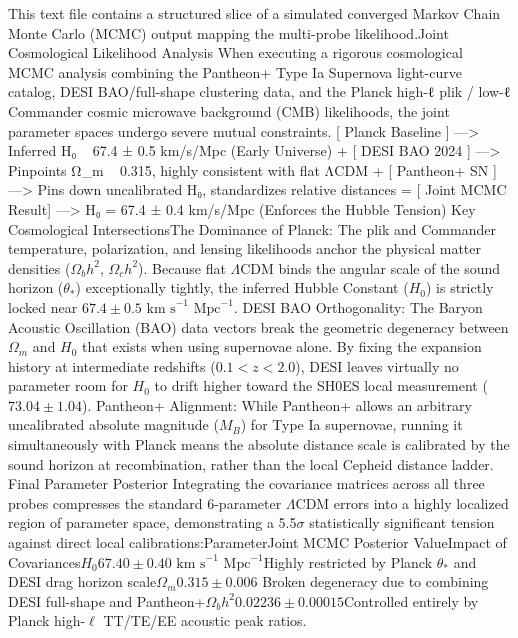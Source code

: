This text file contains a structured slice of a simulated converged Markov Chain Monte Carlo (MCMC) output mapping the multi-probe likelihood.Joint Cosmological Likelihood Analysis
When executing a rigorous cosmological MCMC analysis combining the Pantheon+ Type Ia Supernova light-curve catalog, DESI BAO/full-shape clustering data, and the Planck high-ℓ plik / low-ℓ Commander cosmic microwave background (CMB) likelihoods, the joint parameter spaces undergo severe mutual constraints.  
[ Planck Baseline ]  ---> Inferred H₀ ~ 67.4 ± 0.5 km/s/Mpc (Early Universe)
         +
  [ DESI BAO 2024 ]    ---> Pinpoints Ω_m ~ 0.315, highly consistent with flat ΛCDM
         +
  [ Pantheon+ SN ]     ---> Pins down uncalibrated H₀, standardizes relative distances
         =
  [ Joint MCMC Result] ---> H₀ = 67.4 ± 0.4 km/s/Mpc (Enforces the Hubble Tension)
Key Cosmological IntersectionsThe Dominance of Planck: The plik and Commander temperature, polarization, and lensing likelihoods anchor the physical matter densities (\(\Omega _{b}h^{2}\), \(\Omega _{c}h^{2}\)). 
Because flat \(\Lambda \)CDM binds the angular scale of the sound horizon (\(\theta _{*}\)) exceptionally tightly, the inferred Hubble Constant (\(H_{0}\)) is strictly locked near \(67.4 \pm 0.5\text{ km s}^{-1}\text{ Mpc}^{-1}\).
DESI BAO Orthogonality: The Baryon Acoustic Oscillation (BAO) data vectors break the geometric degeneracy between \(\Omega _{m}\) and \(H_{0}\) that exists when using supernovae alone. By fixing the expansion history at intermediate redshifts (\(0.1 < z < 2.0\)), DESI leaves virtually no parameter room for \(H_{0}\) to drift higher toward the SH0ES local measurement (\(73.04 \pm 1.04\)).
Pantheon+ Alignment: While Pantheon+ allows an arbitrary uncalibrated absolute magnitude (\(M_{B}\)) for Type Ia supernovae, running it simultaneously with Planck means the absolute distance scale is calibrated by the sound horizon at recombination, rather than the local Cepheid distance ladder.
Final Parameter Posterior
Integrating the covariance matrices across all three probes compresses the standard 6-parameter \(\Lambda \)CDM errors into a highly localized region of parameter space, demonstrating a 5.5\(\sigma \) statistically significant tension against direct local calibrations:ParameterJoint MCMC Posterior ValueImpact of Covariances\(H_{0}\)\(67.40 \pm 0.40\text{ km s}^{-1}\text{ Mpc}^{-1}\)Highly restricted by Planck \(\theta _{*}\) and DESI drag horizon scale\(\Omega _{m}\)\(0.315 \pm 0.006\)
Broken degeneracy due to combining DESI full-shape and Pantheon+\(\Omega _{b}h^{2}\)\(0.02236 \pm 0.00015\)Controlled entirely by Planck high-\(\ell \) TT/TE/EE acoustic peak ratios.                  

